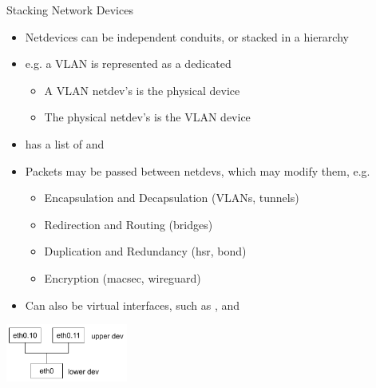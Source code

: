 \begin{frame}{Stacking Network Devices}
	\begin{itemize}
		\item Netdevices can be independent conduits, or stacked in a hierarchy
		\item e.g. a VLAN is represented as a dedicated 
			\begin{itemize}
				\item A VLAN netdev's  is the physical device
				\item The physical netdev's  is the VLAN device
			\end{itemize}
		\item {} has a list of  and 
		\item Packets may be passed between netdevs, which may modify them, e.g.
			\begin{itemize}
				\item Encapsulation and Decapsulation (VLANs, tunnels)
				\item Redirection and Routing (bridges)
				\item Duplication and Redundancy (hsr, bond)
				\item Encryption (macsec, wireguard)
			\end{itemize}
		\item Can also be virtual interfaces, such as ,  and 
	\end{itemize}
	\begin{center}
		\includegraphics[width=0.3\textwidth]{slides/networking-stack-netdevice/vlan_uplow.pdf}
	\end{center}
\end{frame}

